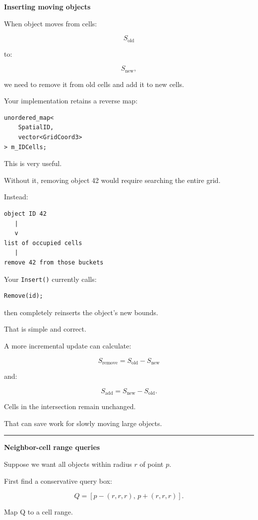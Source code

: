 \textbf{Inserting moving objects}

When object moves from cells:

\[
S_{\text{old}}
\]

to:

\[
S_{\text{new}},
\]

we need to remove it from old cells and add it to new cells.

Your implementation retains a reverse map:

\begin{verbatim}
unordered_map<
    SpatialID,
    vector<GridCoord3>
> m_IDCells;
\end{verbatim}

This is very useful.

Without it, removing object 42 would require searching the entire grid.

Instead:

\begin{verbatim}
object ID 42
   |
   v
list of occupied cells
   |
remove 42 from those buckets
\end{verbatim}

Your \texttt{Insert()} currently calls:

\begin{verbatim}
Remove(id);
\end{verbatim}

then completely reinserts the object's new bounds.

That is simple and correct.

A more incremental update can calculate:

\[
S_{\text{remove}}
=
S_{\text{old}}-S_{\text{new}}
\]

and:

\[
S_{\text{add}}
=
S_{\text{new}}-S_{\text{old}}.
\]

Cells in the intersection remain unchanged.

That can save work for slowly moving large objects.

\begin{center}\rule{0.5\linewidth}{0.5pt}\end{center}

\textbf{Neighbor-cell range queries}

Suppose we want all objects within radius \(r\) of point \(p\).

First find a conservative query box:

\[
Q=
[p-(r,r,r),\,
 p+(r,r,r)].
\]

Map Q to a cell range.

